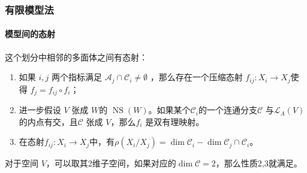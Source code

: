 \documentclass[10pt]{ctexbeamer}
\begin{document}
\begin{frame}[shrink]
  \frametitle{有限模型法}
  \framesubtitle{模型间的态射}
  这个划分中相邻的多面体之间有态射：
  \begin{enumerate}
    \item 如果 $ i,j $ 两个指标满足 $ \mathcal{A}_j\cap \mathcal{C}_i\neq \emptyset $ ，那么存在一个压缩态射 $ f_{ij}:X_i\to X_j $使得 $ f_j=f_{ij}\circ f_i $；
    \item 进一步假设 $ V $ 张成 $W$的 $\operatorname{NS}(W)$。如果某个$ \mathcal{C}_i $的一个连通分支$ \mathcal{C} $ 与$ \mathcal{L}_A(V) $的内点有交，且$ \mathcal{C} $ 张成 $ V $，那么$ f_i $ 是双有理映射。
    \item 在态射$f_{ij}:X_{i}\to X_{j}$中，有$ \rho(X_i/X_j)=\dim  \mathcal{C}_i-\dim \mathcal{C}_j\cap \mathcal{C}_i   $。
  \end{enumerate}


\begin{center}
\end{center}
  \pause
对于空间 $V$，可以取其2维子空间，如果对应的$\dim \mathcal{C}=2 $，那么性质2,3就满足。
\end{frame}
\end{document}
